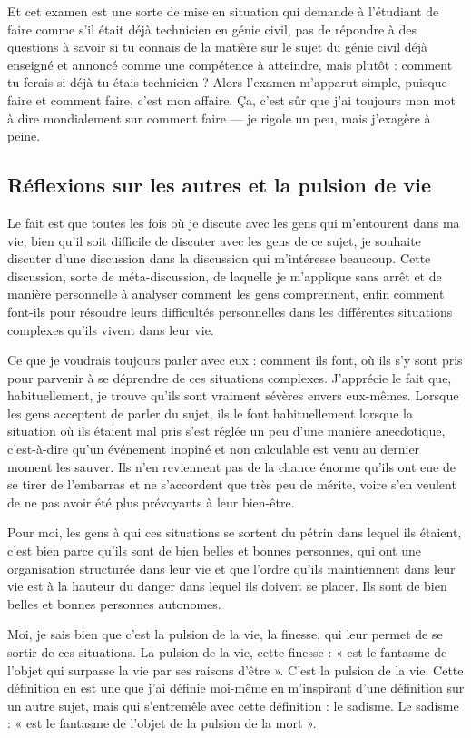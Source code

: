 \documentclass[12pt,oneside]{article}
\begin{document}
Et cet examen est une sorte de mise en situation qui demande à l'étudiant de faire comme s'il était déjà technicien en génie civil, pas de répondre à des questions à savoir si tu connais de la matière sur le sujet du génie civil déjà enseigné et annoncé comme une compétence à atteindre, mais plutôt : comment tu ferais si déjà tu étais technicien ? Alors l'examen m'apparut simple, puisque faire et comment faire, c'est mon affaire. Ça, c'est sûr que j'ai toujours mon mot à dire mondialement sur comment faire --- je rigole un peu, mais j'exagère à peine.

\subsection{Réflexions sur les autres et la pulsion de vie}

Le fait est que toutes les fois où je discute avec les gens qui m'entourent dans ma vie, bien qu'il soit difficile de discuter avec les gens de ce sujet, je souhaite discuter d'une discussion dans la discussion qui m'intéresse beaucoup. Cette discussion, sorte de méta-discussion, de laquelle je m'applique sans arrêt et de manière personnelle à analyser comment les gens comprennent, enfin comment font-ils pour résoudre leurs difficultés personnelles dans les différentes situations complexes qu'ils vivent dans leur vie.

Ce que je voudrais toujours parler avec eux : comment ils font, où ils s'y sont pris pour parvenir à se déprendre de ces situations complexes. J'apprécie le fait que, habituellement, je trouve qu'ils sont vraiment sévères envers eux-mêmes. Lorsque les gens acceptent de parler du sujet, ils le font habituellement lorsque la situation où ils étaient mal pris s'est réglée un peu d'une manière anecdotique, c'est-à-dire qu'un événement inopiné et non calculable est venu au dernier moment les sauver. Ils n'en reviennent pas de la chance énorme qu'ils ont eue de se tirer de l'embarras et ne s'accordent que très peu de mérite, voire s'en veulent de ne pas avoir été plus prévoyants à leur bien-être.

Pour moi, les gens à qui ces situations se sortent du pétrin dans lequel ils étaient, c'est bien parce qu'ils sont de bien belles et bonnes personnes, qui ont une organisation structurée dans leur vie et que l'ordre qu'ils maintiennent dans leur vie est à la hauteur du danger dans lequel ils doivent se placer. Ils sont de bien belles et bonnes personnes autonomes.

Moi, je sais bien que c'est la pulsion de la vie, la finesse, qui leur permet de se sortir de ces situations. La pulsion de la vie, cette finesse : « est le fantasme de l'objet qui surpasse la vie par ses raisons d'être ». C'est la pulsion de la vie. Cette définition en est une que j'ai définie moi-même en m'inspirant d'une définition sur un autre sujet, mais qui s'entremêle avec cette définition : le sadisme. Le sadisme : « est le fantasme de l'objet de la pulsion de la mort ».
\end{document}
